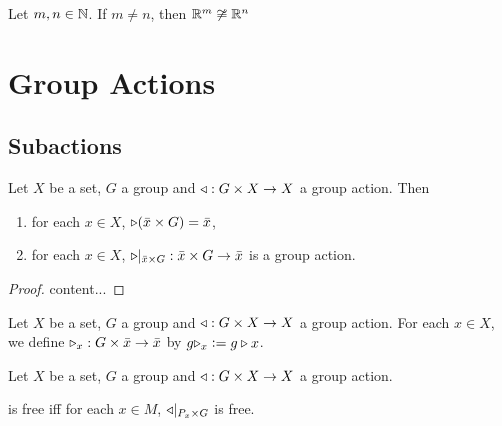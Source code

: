 \documentclass{book}
\begin{document}
\begin{thm}
Let $m,n \in \mathbb{N}$. If $m \neq n$, then $\mathbb{R}^m \not \cong \mathbb{R}^n$
\end{thm}







































\section{Group Actions}

\subsection{Subactions}

\begin{ex}
	Let $X$ be a set, $G$ a group and $\triangleleft:G\times X \rightarrow X$ a group action. Then 
	\begin{enumerate}
		\item for each $x \in X$, $\triangleright(\bar{x} \times G) = \bar{x}$,
		\item for each $x \in X$, $\triangleright|_{\bar{x} \times G}: \bar{x} \times G \rightarrow \bar{x}$ is a group action.
	\end{enumerate}
\end{ex}

\begin{proof}
	content...
\end{proof}

\begin{defn}
	Let $X$ be a set, $G$ a group and $\triangleleft:G\times X \rightarrow X$ a group action. For each $x \in X$, we define  $\triangleright_x: G \times \bar{x} \rightarrow \bar{x}$ by $g \triangleright_x \vcentcolon= g \triangleright x$.
\end{defn}
\begin{ex}
	Let $X$ be a set, $G$ a group and $\triangleleft:G\times X \rightarrow X$ a group action.  
	
	is free iff for each $x \in M$, $\triangleleft|_{P_x \times G}$ is free. 
\end{ex}
\end{document}
